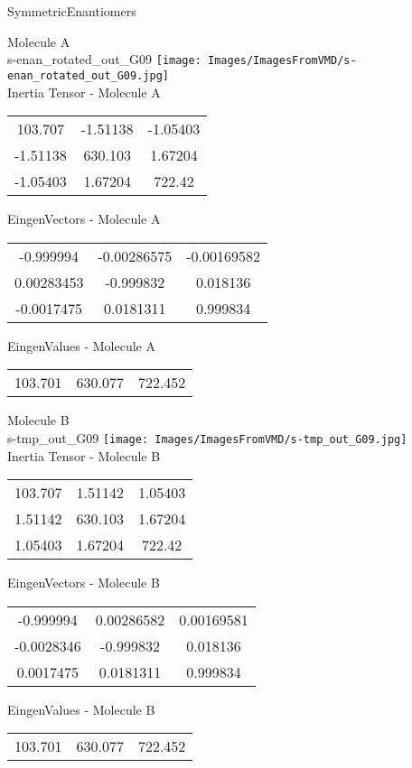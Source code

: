\vtab[-2cm]
\begin{center}
{\large SymmetricEnantiomers}
\end{center}
\begin{multicols}{2}
\begin{center}
Molecule A \\ 
s-enan\_rotated\_out\_G09
\texttt{[image: Images/ImagesFromVMD/s-enan\_rotated\_out\_G09.jpg]}
\\
Inertia Tensor - Molecule A \\
\vtab
\begin{tabular}{|c c c|}
103.707	 & 	-1.51138	 & 	-1.05403	 \\
-1.51138	 & 	630.103	 & 	1.67204	 \\
-1.05403	 & 	1.67204	 & 	722.42
\end{tabular}

\vtab
 EingenVectors - Molecule A     \\
\vtab
\begin{tabular}{|c c c|}
-0.999994	 & 	-0.00286575	 & 	-0.00169582	 \\
0.00283453	 & 	-0.999832	 & 	0.018136	 \\
-0.0017475	 & 	0.0181311	 & 	0.999834
\end{tabular}

\vtab
 EingenValues - Molecule A     \\
\vtab
\begin{tabular}{|c c c|}
103.701	 & 	630.077	 & 	722.452
\end{tabular}
\columnbreak

Molecule B \\ 
s-tmp\_out\_G09
\texttt{[image: Images/ImagesFromVMD/s-tmp\_out\_G09.jpg]}
\\
Inertia Tensor - Molecule B \\
\vtab
\begin{tabular}{|c c c|}
103.707	 & 	1.51142	 & 	1.05403	 \\
1.51142	 & 	630.103	 & 	1.67204	 \\
1.05403	 & 	1.67204	 & 	722.42
\end{tabular}

\vtab
 EingenVectors - Molecule B     \\
\vtab
\begin{tabular}{|c c c|}
-0.999994	 & 	0.00286582	 & 	0.00169581	 \\
-0.0028346	 & 	-0.999832	 & 	0.018136	 \\
0.0017475	 & 	0.0181311	 & 	0.999834
\end{tabular}

\vtab
 EingenValues - Molecule B     \\
\vtab
\begin{tabular}{|c c c|}
103.701	 & 	630.077	 & 	722.452
\end{tabular}

\end{center}
\end{multicols}
